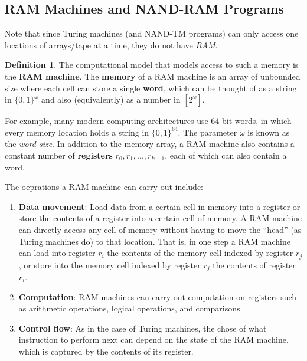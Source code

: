 \documentclass[a4paper, 12pt]{report}
\theoremstyle{remark}
\theoremstyle{definition}
\newtheorem{definition}{Definition}[section]
\begin{document}
\subsection{RAM Machines and NAND-RAM Programs}
Note that since Turing machines (and NAND-TM programs) can only access one locations of arrays/tape at a time, they do not have \textit{RAM}.

\begin{definition}
The computational model that models access to such a memory is the \textbf{RAM machine}. The \textbf{memory} of a RAM machine is an array of unbounded size where each cell can store a single \textbf{word}, which can be thought of as a string in $\{0,1\}^\omega$ and also (equivalently) as a number in $[2^\omega]$. 
\end{definition}

For example, many modern computing architectures use 64-bit words, in which every memory location holds a string in $\{0,1\}^{64}$. The parameter $\omega$ is known as the \textit{word size}. In addition to the memory array, a RAM machine also contains a constant number of \textbf{registers} $r_0, r_1, ..., r_{k-1}$, each of which can also contain a word. 

The oeprations a RAM machine can carry out include: 
\begin{enumerate}
    \item \textbf{Data movement}: Load data from a certain cell in memory into a register or store the contents of a register into a certain cell of memory. A RAM machine can directly access any cell of memory without having to move the “head” (as Turing machines do) to that location. That is, in one step a RAM machine can load into register $r_i$ the contents of the memory cell indexed by register $r_j$, or store into the memory cell indexed by register $r_j$ the contents of register $r_i$. 
    \item \textbf{Computation}: RAM machines can carry out computation on registers such as arithmetic operations, logical operations, and comparisons. 
    \item \textbf{Control flow}: As in the case of Turing machines, the chose of what instruction to perform next can depend on the state of the RAM machine, which is captured by the contents of its register. 
\end{enumerate}
\end{document}
